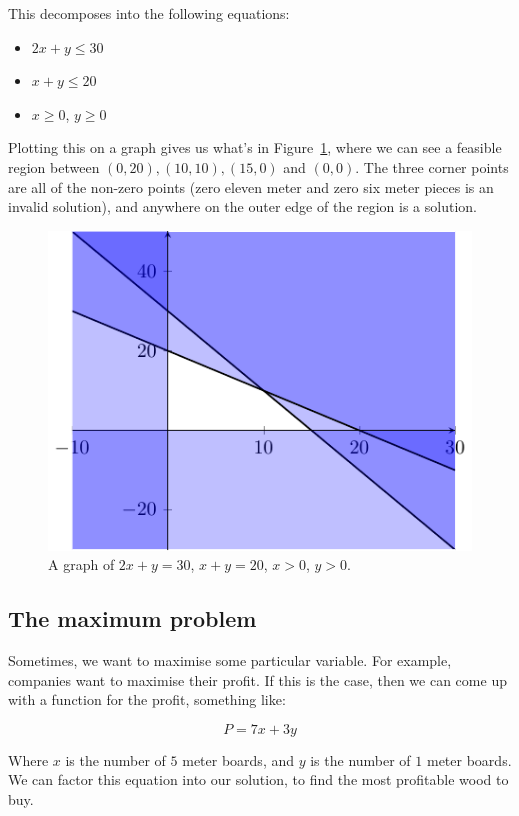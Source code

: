 This decomposes into the following equations:

\begin{itemize}
  \item $2x + y \leq 30$
  \item $x + y \leq 20$
  \item $x \geq 0$, $y \geq 0$
\end{itemize}


Plotting this on a graph gives us what's in Figure~\ref{fig:graph-4}, where we
can see a feasible region between $(0, 20), (10, 10), (15, 0)$ and  $(0,0)$. The
three corner points are all of the non-zero points (zero eleven meter and zero
six meter pieces is an invalid solution), and anywhere on the outer edge of the
region is a solution.

\begin{figure}[h]
  \centering
  \includegraphics{diagrams/graph4}
  \caption{A graph of $2x + y = 30$, $x + y = 20$, $x > 0$, $y > 0$.}
  \label{fig:graph-4}
\end{figure}

\subsection{The maximum problem}

Sometimes, we want to maximise some particular variable. For example, companies
want to maximise their profit. If this is the case, then we can come up with a
function for the profit, something like:

\[
  P = 7x + 3y
\]

Where $x$ is the number of $5$ meter boards, and $y$ is the number of $1$ meter
boards. We can factor this equation into our solution, to find the most
profitable wood to buy.

